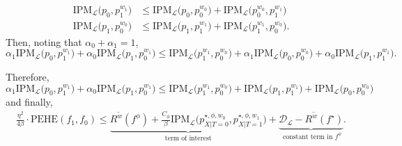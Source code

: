 \documentclass[12pt]{article}
\theoremstyle{plain}
\theoremstyle{definition}
\theoremstyle{remark}
\begin{document}
\begin{align*}
\text{IPM}_{\mathcal{L}}\big( p_{0} ,p_{1}^{w_{1}}\big) & \leq \text{IPM}_{\mathcal{L}}\big( p_{0} ,p_{0}^{w_{0}}\big) +\text{IPM}_{\mathcal{L}}\big( p_{0}^{w_{0}} ,p_{1}^{w_{1}}\big)\\
\text{IPM}_{\mathcal{L}}\big( p_{1} ,p_{0}^{w_{0}}\big) & \leq \text{IPM}_{\mathcal{L}}\big( p_{1} ,p_{1}^{w_{1}}\big) +\text{IPM}_{\mathcal{L}}\big( p_{1}^{w_{1}} ,p_{0}^{w_{0}}\big).
\end{align*}
Then, noting that $ \alpha _{0} +\alpha _{1} =1$,
\begin{equation*}
\alpha _{1} \text{IPM}_{\mathcal{L}}\big( p_{0} ,p_{1}^{w_{1}}\big) +\alpha _{0} \text{IPM}_{\mathcal{L}}\big( p_{1} ,p_{0}^{w_{1}}\big) \leq \text{IPM}_{\mathcal{L}}\big( p_{1}^{w_{1}} ,p_{0}^{w_{0}}\big) +\alpha _{1} \text{IPM}_{\mathcal{L}}\big( p_{0} ,p_{0}^{w_{0}}\big) +\alpha _{0} \text{IPM}_{\mathcal{L}}\big( p_{1} ,p_{1}^{w_{1}}\big).
\end{equation*}

Therefore, 
\begin{equation*}
\alpha _{1} \text{IPM}_{\mathcal{L}}\big( p_{0} ,p_{1}^{w_{1}}\big) +\alpha _{0} \text{IPM}_{\mathcal{L}}\big( p_{1} ,p_{0}^{w_{1}}\big) \leq \text{IPM}_{\mathcal{L}}\big( p_{1}^{w_{1}} ,p_{0}^{w_{0}}\big) + \text{IPM}_{\mathcal{L}}\big( p_{1} ,p_{1}^{w_{1}}\big) + \text{IPM}_{\mathcal{L}}\big( p_{0} ,p_{0}^{w_{0}}\big)
\end{equation*}
and finally, 
\begin{align*}
   \frac{\eta^2}{4\beta} \cdot \text{PEHE}(f_1,f_0)  \leq   \underbrace{R^{\tilde{w}}(f^\phi)   +  \frac{C_{\phi}}{\beta} \text{IPM}_{\mathcal{L}}\Big(  p^{\star,\phi,w_0}_{X | T=0},p^{\star,\phi,w_1}_{X | T=1}\Big)}_{\text{term of interest}} +\underbrace{\mathcal{D}_{\mathcal{L}}-R^{\tilde{w}}(f^{\star})}_{\text{ constant term in  $f^\phi$}}.    
\end{align*}
\end{document}
